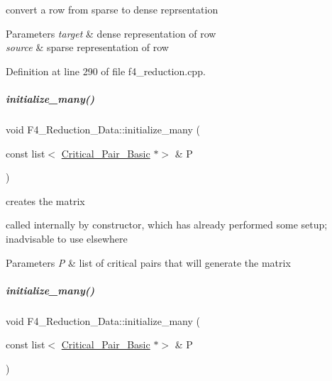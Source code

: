 convert a row from sparse to dense reprsentation 


\begin{DoxyParams}{Parameters}
{\em target} & dense representation of row \\
\hline
{\em source} & sparse representation of row \\
\hline
\end{DoxyParams}


Definition at line 290 of file f4\+\_\+reduction.\+cpp.

\mbox{\label{group___g_b_computation_a0fd30b42c2dcf0dd07dfa898f71c8751}} 
\subparagraph{\texorpdfstring{initialize\+\_\+many()}{initialize\_many()}\hspace{0.1cm}{\footnotesize\ttfamily [1/3]}}
{\footnotesize\ttfamily void F4\+\_\+\+Reduction\+\_\+\+Data\+::initialize\+\_\+many (\begin{DoxyParamCaption}\item[{const list$<$ \hyperlink{group___g_b_computation_class_critical___pair___basic}{Critical\+\_\+\+Pair\+\_\+\+Basic} $\ast$$>$ \&}]{P }\end{DoxyParamCaption})}



creates the matrix 

called internally by constructor, which has already performed some setup; inadvisable to use elsewhere 
\begin{DoxyParams}{Parameters}
{\em P} & list of critical pairs that will generate the matrix \\
\hline
\end{DoxyParams}
\mbox{\label{group___g_b_computation_a0fd30b42c2dcf0dd07dfa898f71c8751}} 
\subparagraph{\texorpdfstring{initialize\+\_\+many()}{initialize\_many()}\hspace{0.1cm}{\footnotesize\ttfamily [2/3]}}
{\footnotesize\ttfamily void F4\+\_\+\+Reduction\+\_\+\+Data\+::initialize\+\_\+many (\begin{DoxyParamCaption}\item[{const list$<$ \hyperlink{group___g_b_computation_class_critical___pair___basic}{Critical\+\_\+\+Pair\+\_\+\+Basic} $\ast$$>$ \&}]{P }\end{DoxyParamCaption})}




